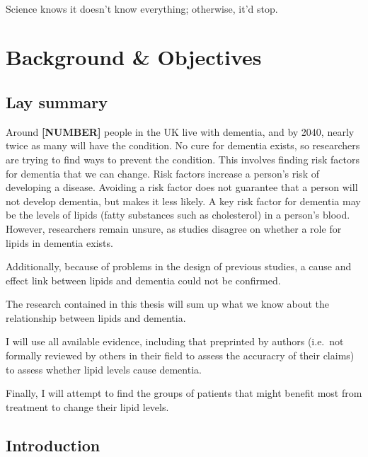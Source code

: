 \documentclass[a4paper, twoside]{templates/ociamthesis}
\begin{document}
~

\begin{savequote}
Science knows it doesn't know everything; otherwise, it'd stop.
\end{savequote}



\hypertarget{background-heading}{%
\chapter{Background \& Objectives}\label{background-heading}}

\minitoc 

\hypertarget{lay-summary}{%
\section{Lay summary}\label{lay-summary}}

Around \textbf{{[}NUMBER{]}} people in the UK live with dementia, and by 2040, nearly twice as many will have the condition. No cure for dementia exists, so researchers are trying to find ways to prevent the condition. This involves finding risk factors for dementia that we can change. Risk factors increase a person's risk of developing a disease. Avoiding a risk factor does not guarantee that a person will not develop dementia, but makes it less likely. A key risk factor for dementia may be the levels of lipids (fatty substances such as cholesterol) in a person's blood. However, researchers remain unsure, as studies disagree on whether a role for lipids in dementia exists.

Additionally, because of problems in the design of previous studies, a cause and effect link between lipids and dementia could not be confirmed.

The research contained in this thesis will sum up what we know about the relationship between lipids and dementia.

I will use all available evidence, including that preprinted by authors (i.e.~not formally reviewed by others in their field to assess the accuracry of their claims) to assess whether lipid levels cause dementia.

Finally, I will attempt to find the groups of patients that might benefit most from treatment to change their lipid levels.

\hypertarget{introduction}{%
\section{Introduction}\label{introduction}}
\end{document}
